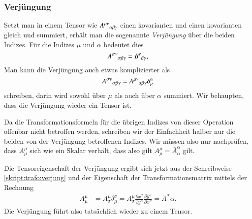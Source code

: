\subsubsection{Verjüngung}
Setzt man in einem Tensor wie $A^{\mu\nu}\mathstrut_{\alpha\beta\gamma}$
einen kovarianten und einen kovarianten gleich und summiert,
erhält man die sogenannte {\em Verjüngung} über die beiden Indizes.
Für die Indizes $\mu$ und $\alpha$ bedeutet dies
\[
A^{\sigma\nu}\mathstrut_{\sigma\beta\gamma}
=
B^\nu\mathstrut_{\beta\gamma},
\]
Man kann die Verjüngung auch etwas komplizierter als
\begin{equation}
A^{\sigma\nu}\mathstrut_{\sigma\beta\gamma}
=
A^{\mu\nu}\mathstrut_{\alpha\beta\gamma}\delta^\alpha_\mu
\label{skript:trafo:verjung}
\end{equation}
schreiben, darin wird sowohl über $\mu$ als auch über $\alpha$
summiert.
Wir behaupten, dass die Verjüngung wieder ein Tensor ist.

Da die Transformationsformeln für die übrigen Indizes von dieser
Operation offenbar nicht betroffen werden, schreiben wir der Einfachheit
halber nur die beiden von der Verjüngung betroffenen Indizes.
Wir müssen also nur nachprüfen, dass $A^\mu_\mu$ sich wie ein Skalar
verhält, dass also gilt $A^\mu_\mu=\bar A^\alpha_\alpha$ gilt.

Die Tensoreigenschaft der Verjüngung ergibt sich jetzt aus der Schreibweise
\eqref{skript:trafo:verjung}
und der Eigenschaft 
\label{label:trafo:t}
der Transformationsmatrix mittels der Rechnung
\begin{align*}
A^\mu_\mu
&=
A^\mu_\sigma
\delta^\sigma_\mu
=
A^\mu_\sigma
\frac{\partial x^\sigma}{\partial y^\alpha}
\frac{\partial y^\alpha}{\partial x^\mu}
=
\bar A^\alpha\alpha.
\end{align*}
Die Verjüngung führt also tatsächlich wieder zu einem Tensor.

